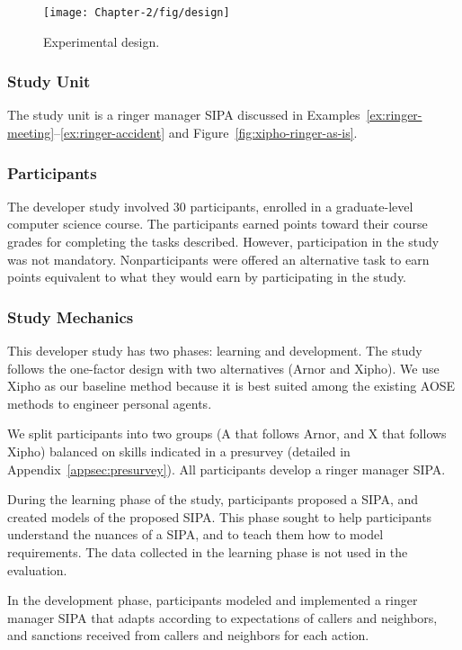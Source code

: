 \documentclass[11pt,          %
               phd,           %
               onehalfspacing %
               ]{ncsuthesis}
\newcommand{\frameworkA}{Arnor\xspace}
\begin{document}
\begin{figure}[!htb] \centering
\texttt{[image: Chapter-2/fig/design]}
\caption{Experimental design.}
\label{fig:design} \end{figure}

\subsubsection*{Study Unit} 

The study unit is a ringer manager SIPA discussed 
in Examples~\ref{ex:ringer-meeting}--\ref{ex:ringer-accident} and Figure~\ref{fig:xipho-ringer-as-is}.

\subsubsection*{Participants}

The developer study involved 30 participants, enrolled in a
graduate-level computer science course. The participants earned points
toward their course grades for completing the tasks described. However,
participation in the study was not mandatory. Nonparticipants were
offered an alternative task to earn points equivalent to what they would
earn by participating in the study.

\subsubsection*{Study Mechanics}

This developer study has two phases: learning and development.  The study 
follows the one-factor design with two alternatives (\frameworkA and Xipho).  
We use Xipho as our baseline method because it is best suited among the
existing AOSE methods to engineer personal agents.

We split participants into two groups (A that follows \frameworkA, and X
that follows Xipho) balanced on skills indicated in a presurvey
(detailed in Appendix~\ref{appsec:presurvey}). All participants develop
a ringer manager SIPA.

\begin{description}[leftmargin=1em]

\item[Learning Phase.] During the learning phase of the study,
participants proposed a SIPA, and created models of the proposed SIPA.
This phase sought to help participants understand the nuances of a SIPA,
and to teach them how to model requirements. The data collected in the
learning phase is not used in the evaluation. 

\item[Development Phase.] In the development phase, participants
modeled and implemented a ringer manager SIPA that adapts according
to expectations of callers and 
neighbors, and sanctions received from callers and
neighbors for each action.

\end{description}
\end{document}
